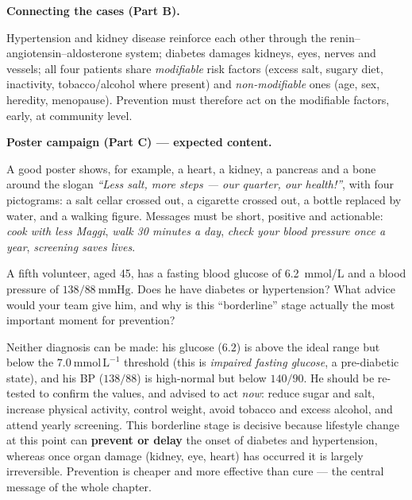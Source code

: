 \documentclass[11pt]{article}
\begin{document}
\textbf{Connecting the cases (Part B).}\par
Hypertension and kidney disease reinforce each other through the renin--angiotensin--aldosterone system; diabetes damages kidneys, eyes, nerves and vessels; all four patients share \emph{modifiable} risk factors (excess salt, sugary diet, inactivity, tobacco/alcohol where present) and \emph{non-modifiable} ones (age, sex, heredity, menopause). Prevention must therefore act on the modifiable factors, early, at community level.

\textbf{Poster campaign (Part C) — expected content.}\par
A good poster shows, for example, a heart, a kidney, a pancreas and a bone around the slogan \emph{``Less salt, more steps — our quarter, our health!''}, with four pictograms: a salt cellar crossed out, a cigarette crossed out, a bottle replaced by water, and a walking figure. Messages must be short, positive and actionable: \emph{cook with less Maggi}, \emph{walk 30 minutes a day}, \emph{check your blood pressure once a year}, \emph{screening saves lives}.

\begin{exercice}
A fifth volunteer, aged 45, has a fasting blood glucose of \SI{6.2}{mmol/L} and a blood pressure of $138/88\ \mathrm{mmHg}$. Does he have diabetes or hypertension? What advice would your team give him, and why is this ``borderline'' stage actually the most important moment for prevention?
\end{exercice}

\begin{corrige}
Neither diagnosis can be made: his glucose ($6.2$) is above the ideal range but below the $7.0\ \mathrm{mmol\,L^{-1}}$ threshold (this is \emph{impaired fasting glucose}, a pre-diabetic state), and his BP ($138/88$) is high-normal but below $140/90$. He should be re-tested to confirm the values, and advised to act \emph{now}: reduce sugar and salt, increase physical activity, control weight, avoid tobacco and excess alcohol, and attend yearly screening. This borderline stage is decisive because lifestyle change at this point can \textbf{prevent or delay} the onset of diabetes and hypertension, whereas once organ damage (kidney, eye, heart) has occurred it is largely irreversible. Prevention is cheaper and more effective than cure — the central message of the whole chapter.
\end{corrige}

\newpage
\end{document}
